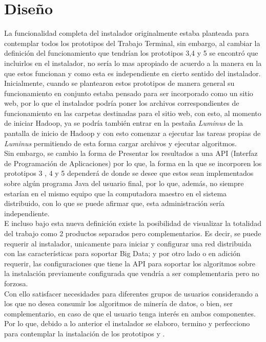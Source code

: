 \section{Diseño}
La funcionalidad completa del instalador originalmente estaba planteada para contemplar todos los prototipos del Trabajo Terminal, sin embargo, al cambiar la definición del funcionamiento que tendrían los prototipos 3,4 y 5 se encontró que incluirlos en el instalador, no sería lo mas apropiado de acuerdo a la manera en la que estos funcionan y como esta es independiente en cierto sentido del instalador.
\\
Inicialmente, cuando se plantearon estos prototipos de manera general su funcionamiento en conjunto estaba pensado para ser incorporado como un sitio web, por lo que el instalador podría poner los archivos correspondientes de funcionamiento en las carpetas destinadas para el sitio web, con esto, al momento de iniciar Hadoop, ya se podría también entrar en la pestaña \emph{Luminus} de la pantalla de inicio de Hadoop y con esto comenzar a ejecutar las tareas propias de \emph{Luminus} permitiendo de esta forma cargar archivos y ejecutar algoritmos.
\\
Sin embargo, se cambio la forma de Presentar los resultados a una API (Interfaz de Programación de Aplicaciones) por lo que, la forma en la que se incorporen los prototipos 3 , 4 y 5 dependerá de donde se desee que estos sean implementados sobre algún programa Java del usuario final, por lo que, además, no siempre estarían en el mismo equipo que la computadora maestro en el sistema distribuido, con lo que se puede afirmar que, esta administración sería independiente.
\\
E incluso bajo esta nueva definición existe la posibilidad de visualizar la totalidad del trabajo como 2 productos separados pero complementarios. Es decir, se puede requerir al instalador, unicamente para iniciar y configurar una red distribuida con las características para soportar Big Data; y por otro lado o en adición requerir, las configuraciones que tiene la API para soportar los algoritmos sobre la instalación previamente configurada que vendría a ser complementaria pero no forzosa.
\\
Con ello satisfacer necesidades para diferentes grupos de usuarios considerando a los que no desea consumir los algoritmos de minería de datos, o bien, ser complementario, en caso de que el usuario tenga interés en ambos componentes. 
\\
Por lo que, debido a lo anterior el instalador se elaboro, termino y perfecciono para contemplar la instalación de los prototipos  y .
